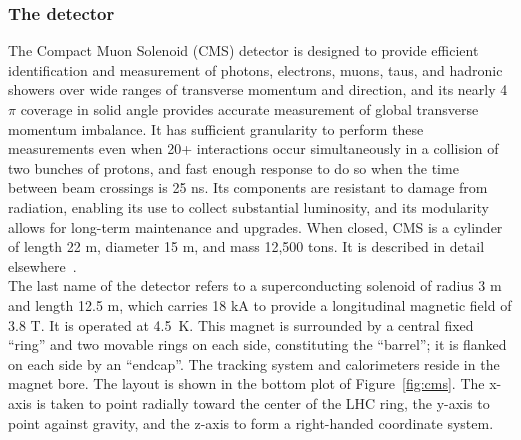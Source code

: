 \subsubsection{The detector}
The Compact Muon Solenoid (CMS) detector is designed to provide efficient 
identification and measurement of photons, electrons, muons, taus, and hadronic showers
over wide ranges of transverse momentum and direction, and its nearly 4$\pi$ coverage
in solid angle provides accurate measurement of global transverse momentum imbalance. 
It has sufficient granularity to perform these measurements even when 20+
interactions occur simultaneously in a collision of two bunches of protons, and fast
enough response to do so when the time between beam crossings is 25 ns. Its components 
are resistant to damage from radiation, enabling its use to collect substantial
luminosity, and its modularity allows for long-term maintenance and upgrades. When
closed, CMS is a cylinder of length 22 m, diameter 15 m, and mass 12,500 tons. It
is described in detail elsewhere~\cite{1748-0221-3-08-S08004}.\\
\indent The last name of the detector refers to a superconducting solenoid of radius 3 m
and length 12.5 m, which carries 18 kA to provide a longitudinal magnetic field of
3.8 T. It is operated at 4.5~K. This magnet is surrounded by a central fixed ``ring''
and two movable rings on each side, constituting the ``barrel''; it is flanked on each
side by an ``endcap''. The tracking system and calorimeters reside in the magnet
bore. The layout is shown in the bottom plot of Figure~\ref{fig:cms}. The x-axis is taken to point
radially toward the center of the LHC ring, the y-axis to point against gravity, and
the z-axis to form a right-handed coordinate system.


